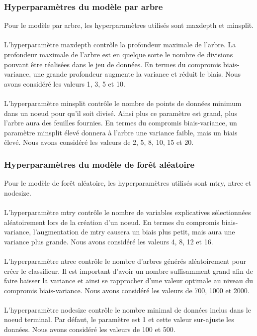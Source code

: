 \subsubsection{Hyperparamètres du modèle par arbre}
Pour le modèle par arbre, les hyperparamètres utilisés sont maxdepth et minsplit. \\\\ 
L'hyperparamètre maxdepth contrôle la profondeur maximale de l'arbre. La profondeur maximale de l'arbre est en quelque sorte le nombre de divisions pouvant être réalisées dans le jeu de données. En termes du compromis biais-variance, une grande profondeur augmente la variance et réduit le biais. Nous avons considéré les valeurs 1, 3, 5 et 10.\\ \\ 
L'hyperparamètre minsplit contrôle le nombre de points de données minimum dans un noeud pour qu'il soit divisé. Ainsi plus ce paramètre est grand, plus l'arbre aura des feuilles fournies. En termes du compromis biais-variance, un paramètre minsplit élevé donnera à l'arbre une variance faible, mais un biais élevé. Nous avons considéré les valeurs de 2, 5, 8, 10, 15 et 20.

\subsubsection{Hyperparamètres du modèle de forêt aléatoire}
Pour le modèle de forêt aléatoire, les hyperparamètres utilisés sont mtry, ntree et nodesize.\\\\ 
L'hyperparamètre mtry contrôle le nombre de variables explicatives sélectionnées aléatoirement lors de la création d'un noeud. En termes du compromis biais-variance, l'augmentation de mtry causera un biais plus petit, mais aura une variance plus grande.  Nous avons considéré les valeurs 4, 8, 12 et 16.\\\\ 
L'hyperparamètre ntree contrôle le nombre d'arbres générés aléatoirement pour créer le classifieur. Il est important d'avoir un nombre suffisamment grand afin de faire baisser la variance et ainsi se rapprocher d'une valeur optimale au niveau du compromis biais-variance. Nous avons considéré les valeurs de 700, 1000 et 2000.\\ \\ 
L'hyperparamètre nodesize contrôle le nombre minimal de données inclus dans le noeud terminal. Par défaut, le paramètre est 1 et cette valeur sur-ajuste les données. Nous avons considéré les valeurs de 100 et 500.


